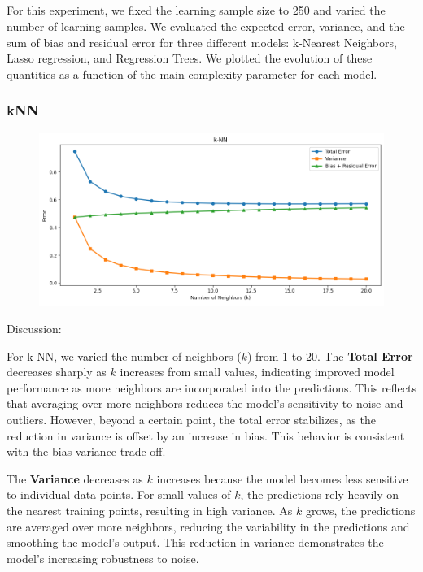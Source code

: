 \documentclass[a4paper,10pt]{article}
\begin{document}
\subsection{}

For this experiment, we fixed the learning sample size to 250 and varied the number of learning samples. We evaluated the expected error, variance, and the sum of bias and residual error for three different models: k-Nearest Neighbors, Lasso regression, and Regression Trees. We plotted the evolution of these quantities as a function of the main complexity parameter for each model.

\subsubsection{kNN}

\begin{figure}[H]
    \centering
    \includegraphics[width=0.8\linewidth]{2.3_knn.png}
\end{figure}

Discussion:

For k-NN, we varied the number of neighbors (\(k\)) from 1 to 20. The \textbf{Total Error} decreases sharply as \(k\) increases from small values, indicating improved model performance as more neighbors are incorporated into the predictions. This reflects that averaging over more neighbors reduces the model’s sensitivity to noise and outliers. However, beyond a certain point, the total error stabilizes, as the reduction in variance is offset by an increase in bias. This behavior is consistent with the bias-variance trade-off.

The \textbf{Variance} decreases as \(k\) increases because the model becomes less sensitive to individual data points. For small values of \(k\), the predictions rely heavily on the nearest training points, resulting in high variance. As \(k\) grows, the predictions are averaged over more neighbors, reducing the variability in the predictions and smoothing the model's output. This reduction in variance demonstrates the model's increasing robustness to noise.
\end{document}
